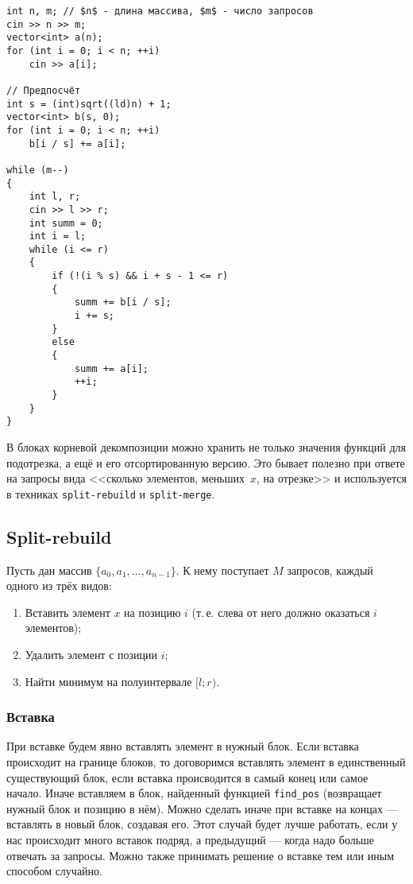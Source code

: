 \begin{verbatim}
int n, m; // $n$ - длина массива, $m$ - число запросов
cin >> n >> m;
vector<int> a(n);
for (int i = 0; i < n; ++i)
    cin >> a[i];

// Предпосчёт
int s = (int)sqrt((ld)n) + 1;
vector<int> b(s, 0);
for (int i = 0; i < n; ++i)
    b[i / s] += a[i];

while (m--)
{
    int l, r;
    cin >> l >> r;
    int summ = 0;
    int i = l;
    while (i <= r)
    {
        if (!(i % s) && i + s - 1 <= r)
        {
            summ += b[i / s];
            i += s;
        }
        else
        {
            summ += a[i];
            ++i;
        }
    }
}
\end{verbatim}

В блоках корневой декомпозиции можно хранить не только значения функций для подотрезка, а ещё и его отсортированную версию. Это бывает полезно при ответе на запросы вида <<сколько элементов, меньших~$x$, на отрезке>> и используется в техниках \texttt{split-rebuild} и \texttt{split-merge}.

\subsection{Split-rebuild}

\begin{problem}
    Пусть дан массив $\{a_0, a_1, \ldots, a_{n - 1}\}$. К нему поступает $M$ запросов, каждый одного из трёх видов:

    \begin{enumerate}[nolistsep]
        \item Вставить элемент $x$ на позицию $i$ (т.\,е. слева от него должно оказаться $i$ элементов);
        \item Удалить элемент с позиции $i$;
        \item Найти минимум на полуинтервале $[l; r)$.
    \end{enumerate}
\end{problem}

\subsubsection{Вставка}

При вставке будем явно вставлять элемент в нужный блок. Если вставка происходит на границе блоков, то договоримся вставлять элемент в единственный существующий блок, если вставка происводится в самый конец или самое начало. Иначе вставляем в блок, найденный функцией \texttt{find\_pos} (возвращает нужный блок и позицию в нём). Можно сделать иначе при вставке на концах --- вставлять в новый блок, создавая его. Этот случай будет лучше работать, если у нас происходит много вставок подряд, а предыдущий --- когда надо больше отвечать за запросы. Можно также принимать решение о вставке тем или иным способом случайно.

